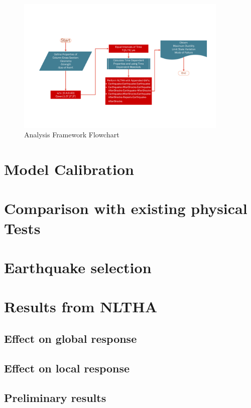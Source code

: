 \begin{figure}[htbp]
	\centering
	\includegraphics[width=0.9\textwidth]{Chapter-5/figs/AnalysisFramework_01}
	\caption{Analysis Framework Flowchart}
	\label{fig:NLTHA_Framework}
\end{figure}

\section{Model Calibration}
\lipsum[2]
\section{Comparison with existing physical Tests}
\lipsum[3]
\section{Earthquake selection}
\lipsum[4]
\section{Results from NLTHA}
\lipsum[5]
\subsection{Effect on global response}
\lipsum[6]
\subsection{Effect on local response}
\lipsum[7]
\subsection{Preliminary results}
\lipsum[8]